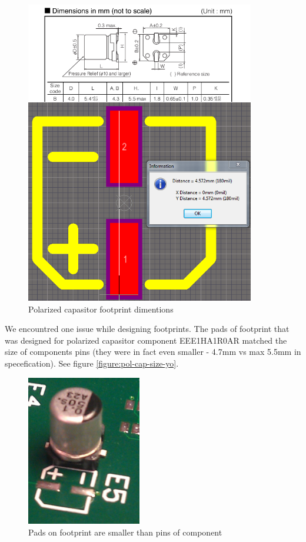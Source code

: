 \begin{figure}
\begin{center}
\includegraphics[width=10cm,keepaspectratio]{pcb/pol_cap_size_footprint_vs_specs.png}
\caption{Polarized capasitor footprint dimentions}
\label{figure:pol-cap-size-yo}
\end{center}
\end{figure}

We encountred one issue while designing footprints.
The pads of footprint that was designed for polarized capasitor component EEE1HA1R0AR matched the size of components pins (they were in fact even smaller - 4.7mm vs max 5.5mm in specefication). 
See figure \vref{figure:pol-cap-size-yo}.

\begin{figure}
\begin{center}
\includegraphics[width=5cm,keepaspectratio]{pcb/pol_cap_size_on_board.png}
\caption{Pads on footprint are smaller than pins of component}
\label{figure:pol-cap-size-board}
\end{center}
\end{figure}

